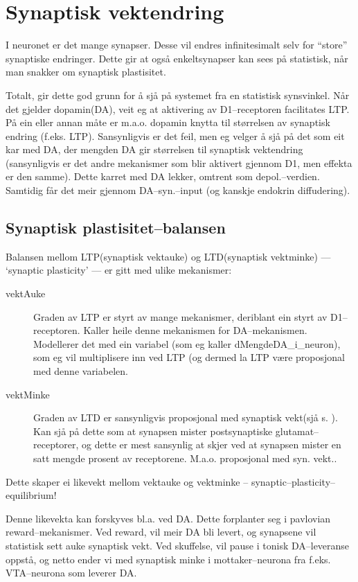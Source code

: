 
\chapter{Synaptisk vektendring}

I neuronet er det mange synapser. Desse vil endres infinitesimalt selv for ``store'' synaptiske endringer. Dette gir at også enkeltsynapser kan sees på statistisk, når man snakker om synaptisk plastisitet.

Totalt, gir dette god grunn for å sjå på systemet fra en statistisk synsvinkel. Når det gjelder dopamin(DA), veit eg at aktivering av D1--receptoren facilitates LTP. På ein eller annan måte er m.a.o. dopamin knytta til størrelsen av synaptisk endring (f.eks. LTP). Sansynligvis er det feil, men eg velger å sjå på det som eit kar med DA, der mengden DA gir størrelsen til synaptisk vektendring (sansynligvis er det andre mekanismer som blir aktivert gjennom D1, men effekta er den samme).
Dette karret med DA lekker, omtrent som depol.--verdien. Samtidig får det meir gjennom DA--syn.--input (og kanskje endokrin diffudering).

\section{Synaptisk plastisitet--balansen}
Balansen mellom LTP(synaptisk vektauke) og LTD(synaptisk vektminke)   --- `synaptic plasticity' --- er gitt med ulike mekanismer:
\begin{description}
	\item[vektAuke] Graden av LTP er styrt av mange mekanismer, deriblant ein styrt av D1--receptoren. Kaller heile denne mekanismen for DA--mekanismen.\\
	Modellerer det med ein variabel (som eg kaller dMengdeDA\_i\_neuron), som eg vil multiplisere inn ved LTP (og dermed la LTP være proposjonal med denne variabelen.
	\item[vektMinke] Graden av LTD er sansynligvis proposjonal med synaptisk vekt(sjå s. \pageref{figur_STDP}). Kan sjå på dette som at synapsen mister postsynaptiske glutamat--receptorer, og dette er mest sansynlig at skjer ved at synapsen mister en satt mengde prosent av receptorene. M.a.o. proposjonal med syn. vekt.. 
\end{description}
Dette skaper ei likevekt mellom vektauke og vektminke -- synaptic--plasticity--equilibrium!

Denne likevekta kan forskyves bl.a. ved DA. Dette forplanter seg i pavlovian reward--mekanismer. Ved reward, vil meir DA bli levert, og synapsene vil statistisk sett auke synaptisk vekt. Ved skuffelse, vil pause i tonisk DA--leveranse oppstå, og netto ender vi med synaptisk minke i mottaker--neurona fra f.eks. VTA--neurona som leverer DA.

